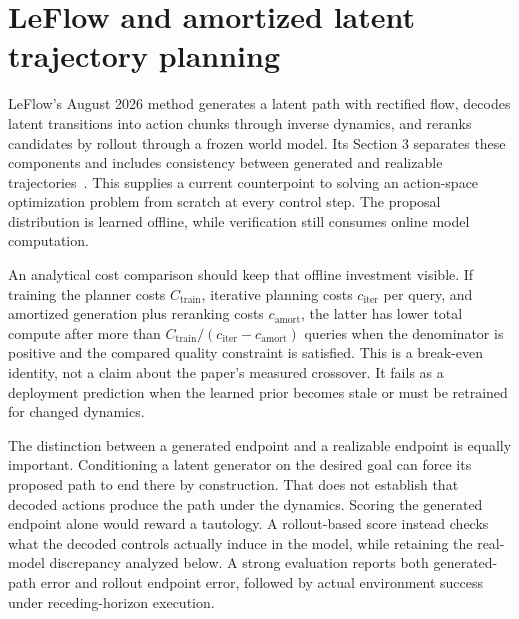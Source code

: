 \section{LeFlow and amortized latent trajectory planning}
\label{sec:C06:frontier}
LeFlow's August 2026 method generates a latent path with rectified flow, decodes latent transitions into action chunks through inverse dynamics, and reranks candidates by rollout through a frozen world model. Its Section 3 separates these components and includes consistency between generated and realizable trajectories~\cite{rewrite_leflow2026}. This supplies a current counterpoint to solving an action-space optimization problem from scratch at every control step. The proposal distribution is learned offline, while verification still consumes online model computation.

An analytical cost comparison should keep that offline investment visible. If training the planner costs $C_{\mathrm{train}}$, iterative planning costs $c_{\mathrm{iter}}$ per query, and amortized generation plus reranking costs $c_{\mathrm{amort}}$, the latter has lower total compute after more than $C_{\mathrm{train}}/(c_{\mathrm{iter}}-c_{\mathrm{amort}})$ queries when the denominator is positive and the compared quality constraint is satisfied. This is a break-even identity, not a claim about the paper's measured crossover. It fails as a deployment prediction when the learned prior becomes stale or must be retrained for changed dynamics.

The distinction between a generated endpoint and a realizable endpoint is equally important. Conditioning a latent generator on the desired goal can force its proposed path to end there by construction. That does not establish that decoded actions produce the path under the dynamics. Scoring the generated endpoint alone would reward a tautology. A rollout-based score instead checks what the decoded controls actually induce in the model, while retaining the real-model discrepancy analyzed below. A strong evaluation reports both generated-path error and rollout endpoint error, followed by actual environment success under receding-horizon execution.


